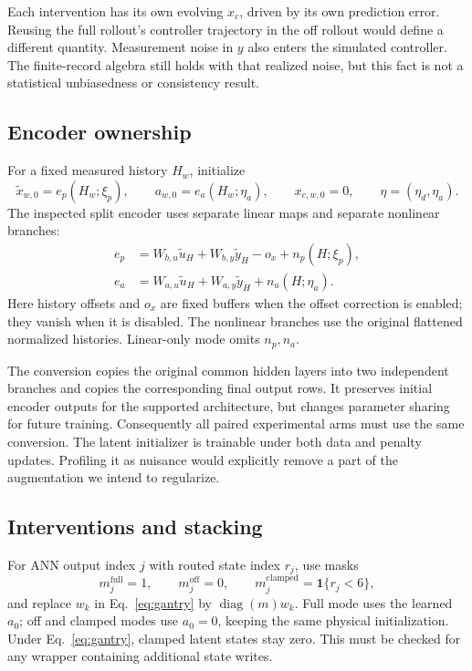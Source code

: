 \documentclass[11pt,a4paper]{article}
\newcommand{\diag}{\operatorname{diag}}
\newcommand{\full}{\mathrm{full}}
\newcommand{\off}{\mathrm{off}}
\newcommand{\clamp}{\mathrm{clamped}}
\theoremstyle{remark}
\begin{document}
Each intervention has its own evolving $x_c$, driven by its own prediction error. Reusing the full rollout's controller trajectory in the off rollout would define a different quantity. Measurement noise in $y$ also enters the simulated controller. The finite-record algebra still holds with that realized noise, but this fact is not a statistical unbiasedness or consistency result.

\subsection{Encoder ownership}
For a fixed measured history $H_w$, initialize
\begin{equation}\label{eq:encoder}
 \tilde x_{w,0}=e_p(H_w;\xi_p),\qquad
 a_{w,0}=e_a(H_w;\eta_a),\qquad x_{c,w,0}=0,
 \qquad \eta=(\eta_d,\eta_a).
\end{equation}
The inspected split encoder uses separate linear maps and separate nonlinear branches:
\begin{align}
 e_p&=W_{b,u}\tilde u_H+W_{b,y}\tilde y_H-o_x+n_p(H;\xi_p),\nonumber\\
 e_a&=W_{a,u}\tilde u_H+W_{a,y}\tilde y_H+n_a(H;\eta_a).\label{eq:encoderbranches}
\end{align}
Here history offsets and $o_x$ are fixed buffers when the offset correction is enabled; they vanish when it is disabled. The nonlinear branches use the original flattened normalized histories. Linear-only mode omits $n_p,n_a$.

The conversion copies the original common hidden layers into two independent branches and copies the corresponding final output rows. It preserves initial encoder outputs for the supported architecture, but changes parameter sharing for future training. Consequently all paired experimental arms must use the same conversion. The latent initializer is trainable under both data and penalty updates. Profiling it as nuisance would explicitly remove a part of the augmentation we intend to regularize.

\subsection{Interventions and stacking}
For ANN output index $j$ with routed state index $r_j$, use masks
\begin{equation}
 m_j^\full=1,\qquad m_j^\off=0,\qquad
 m_j^\clamp=\mathbf1\{r_j<6\},
\end{equation}
and replace $w_k$ in Eq.~\eqref{eq:gantry} by $\diag(m)w_k$. Full mode uses the learned $a_0$; off and clamped modes use $a_0=0$, keeping the same physical initialization. Under Eq.~\eqref{eq:gantry}, clamped latent states stay zero. This must be checked for any wrapper containing additional state writes.
\end{document}
